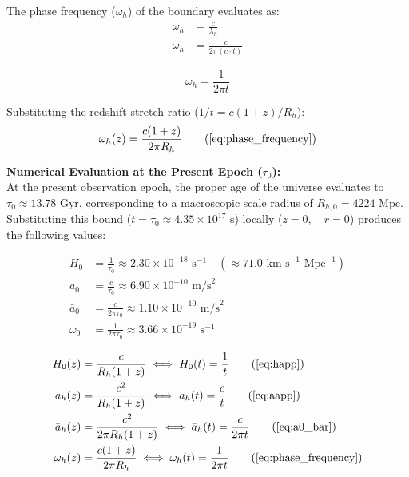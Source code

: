 The phase frequency ($\omega_h$) of the boundary evaluates as:
\begin{align}
    \omega_h &= \frac{c}{\lambda_h} \\
    \omega_h &= \frac{c}{2\pi (c \cdot t)} 
\end{align}

\begin{equation}
    \omega_h = \frac{1}{2\pi t} 
\end{equation}

Substituting the redshift stretch ratio ($1/t = c(1+z)/R_{h}$):
\begin{equation}
    \omega_{h}(z) = \frac{c(1+z)}{2\pi R_{h}} \tag{\ref{eq:phase_frequency}}
\end{equation}

\vspace{0.2 cm}
\textbf{Numerical Evaluation at the Present Epoch ($\tau_0$):} \\
At the present observation epoch, the proper age of the universe evaluates to $\tau_0 \approx 13.78 \text{ Gyr}$, corresponding to a macroscopic scale radius of $R_{h,0} = 4224 \text{ Mpc}$. Substituting this bound ($t = \tau_0 \approx 4.35 \times 10^{17} \text{ s}$) locally ($z=0, \quad r = 0$) produces the following values:

\begin{align}
    H_0 &= \frac{1}{\tau_0} \approx 2.30 \times 10^{-18} \text{ s}^{-1} \quad (\approx 71.0 \text{ km s}^{-1} \text{ Mpc}^{-1}) \\
    a_{0} &= \frac{c}{\tau_0} \approx 6.90 \times 10^{-10} \text{ m/s}^2 \\
    \bar{a}_0 &= \frac{c}{2\pi \tau_0} \approx 1.10 \times 10^{-10} \text{ m/s}^2 \label{eq:a0_bar_numerical} \\
    \omega_0 &= \frac{1}{2\pi \tau_0} \approx 3.66 \times 10^{-19} \text{ s}^{-1}
\end{align}

\begin{tcolorbox}[recallbox, title={\ref{box:kinematic_gradients}. Kinematic Gradients}]
\begin{align}
    H_0(z) &= \frac{c}{R_{h}(1+z)} \iff H_0(t) = \frac{1}{t} \tag{\ref{eq:happ}} \\
    a_{h}(z) &= \frac{c^2}{R_{h}(1+z)} \iff a_{h}(t) = \frac{c}{t} \tag{\ref{eq:aapp}} \\
    \bar{a}_h(z) &= \frac{c^2}{2\pi R_{h}(1+z)} \iff \bar{a}_h(t) = \frac{c}{2\pi t} \tag{\ref{eq:a0_bar}} \\ 
    \omega_{h}(z) &= \frac{c(1+z)}{2\pi R_{h}} \iff \omega_h(t) = \frac{1}{2\pi t} \tag{\ref{eq:phase_frequency}}
\end{align}
\end{tcolorbox}

